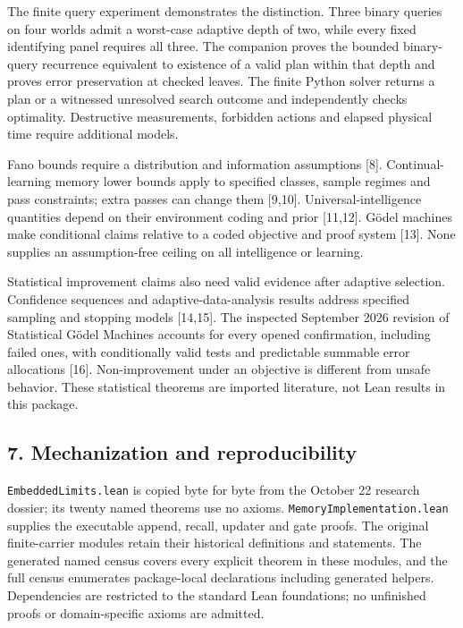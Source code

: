 \documentclass[
  10pt,
]{article}
\begin{document}
The finite query experiment demonstrates the distinction. Three binary queries on four worlds admit a worst-case adaptive depth of two, while every fixed identifying panel requires all three. The companion proves the bounded binary-query recurrence equivalent to existence of a valid plan within that depth and proves error preservation at checked leaves. The finite Python solver returns a plan or a witnessed unresolved search outcome and independently checks optimality. Destructive measurements, forbidden actions and elapsed physical time require additional models.

Fano bounds require a distribution and information assumptions {[}8{]}. Continual-learning memory lower bounds apply to specified classes, sample regimes and pass constraints; extra passes can change them {[}9,10{]}. Universal-intelligence quantities depend on their environment coding and prior {[}11,12{]}. Gödel machines make conditional claims relative to a coded objective and proof system {[}13{]}. None supplies an assumption-free ceiling on all intelligence or learning.

Statistical improvement claims also need valid evidence after adaptive selection. Confidence sequences and adaptive-data-analysis results address specified sampling and stopping models {[}14,15{]}. The inspected September 2026 revision of Statistical Gödel Machines accounts for every opened confirmation, including failed ones, with conditionally valid tests and predictable summable error allocations {[}16{]}. Non-improvement under an objective is different from unsafe behavior. These statistical theorems are imported literature, not Lean results in this package.

\subsection{7. Mechanization and reproducibility}\label{mechanization-and-reproducibility}

\texttt{EmbeddedLimits.lean} is copied byte for byte from the October 22 research dossier; its twenty named theorems use no axioms. \texttt{MemoryImplementation.lean} supplies the executable append, recall, updater and gate proofs. The original finite-carrier modules retain their historical definitions and statements. The generated named census covers every explicit theorem in these modules, and the full census enumerates package-local declarations including generated helpers. Dependencies are restricted to the standard Lean foundations; no unfinished proofs or domain-specific axioms are admitted.
\end{document}
